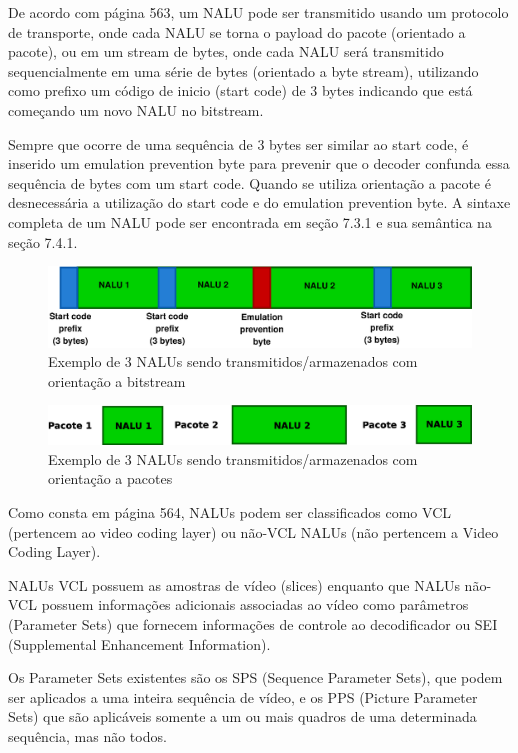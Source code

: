 De acordo com \cite{ieeeVideoVol13N7} página 563, um NALU pode ser transmitido usando um protocolo de transporte, onde cada NALU se torna o payload do pacote (orientado a pacote), ou em um stream de bytes, onde cada NALU será transmitido sequencialmente em uma série de bytes (orientado a byte stream), utilizando como prefixo um código de inicio (start code) de 3 bytes indicando que está começando um novo NALU no bitstream. 

Sempre que ocorre de uma sequência de 3 bytes ser similar ao start code, é inserido um emulation prevention byte para prevenir que o decoder confunda essa sequência de bytes com um start code. Quando se utiliza orientação a pacote é desnecessária a utilização do start code e do emulation prevention byte. A sintaxe completa de um NALU pode ser encontrada em \cite{ituh264avc} seção 7.3.1 e sua semântica na seção 7.4.1.


\begin{figure}[H]
\centering
\includegraphics[scale=0.4]{imagens/fig5.eps}
\caption{Exemplo de 3 NALUs sendo transmitidos/armazenados com orientação a bitstream}
\label{fig:h264_nalu_bitstream}
\end{figure}


\begin{figure}[H]
\centering
\includegraphics[scale=0.4]{imagens/fig6.eps}
\caption{Exemplo de 3 NALUs sendo transmitidos/armazenados com orientação a pacotes}
\label{fig:h264_nalu_packet}
\end{figure}


Como consta em \cite{ieeeVideoVol13N7} página 564, NALUs podem ser classificados como VCL (pertencem ao video coding layer) ou não-VCL NALUs (não pertencem a Video Coding Layer). 

NALUs VCL possuem as amostras de vídeo (slices) enquanto que NALUs não-VCL possuem informações adicionais associadas ao vídeo como parâmetros (Parameter Sets) que fornecem informações de controle ao decodificador ou SEI (Supplemental Enhancement Information). 

Os Parameter Sets existentes são os SPS (Sequence Parameter Sets), que podem ser aplicados a uma inteira sequência de vídeo, e os PPS (Picture Parameter Sets) que são aplicáveis somente a um ou mais quadros de uma determinada sequência, mas não todos. 


